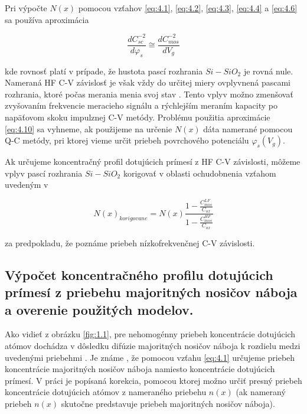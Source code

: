 \par Pri výpočte $N(x)$ pomocou vzťahov \ref{eq:4.1}, \ref{eq:4.2},
\ref{eq:4.3}, \ref{eq:4.4} a \ref{eq:4.6} sa používa aproximácia

\begin{equation}\label{eq:4.10}
\frac{dC_{sc}^{-2}}{d\varphi_{s}} \cong \frac{dC_{mos}^{-2}}{dV_{g}}
\end{equation}

kde rovnosť platí v prípade, že hustota pascí rozhrania $Si-SiO_{2}$
je rovná nule. Nameraná HF C-V závislosť je však vždy do určitej miery
ovplyvnená pascami rozhrania, ktoré počas merania menia svoj stav
\cite{4.15}. Tento vplyv možno zmenšovať zvyšovaním frekvencie
meracieho signálu a rýchlejším meraním kapacity po napäťovom skoku
impulznej C-V metódy.  Problému použitia aproximácie \ref{eq:4.10} sa
vyhneme, ak použijeme na určenie $N(x)$ dáta namerané pomocou Q-C
metódy, pri ktorej vieme určit priebeh povrchového potenciálu
$\varphi_{s}(V_{g})$.

\par Ak určujeme koncentračný profil dotujúcich prímesí z HF C-V
závislosti, môžeme vplyv pascí rozhrania $Si-SiO_{2}$ korigovať v
oblasti ochudobnenia vzťahom uvedeným v \cite{I.1}

\begin{equation}\label{eq:4.11}
N(x)_{korigovane} = N(x) \frac{1-\frac{C_{mos}^{LF}}{C_{ox}}}{1-\frac{C_{mos}^{HF}}{C_{ox}}}
\end{equation}

za predpokladu, že poznáme priebeh nízkofrekvenčnej C-V závislosti.


\subsection[Výpočet koncentračného profilu dotujúcich prímesí z priebehu majoritných nosičov náboja a overenie použitých modelov.]{Výpočet koncentračného profilu dotujúcich prímesí z priebehu majoritných nosičov náboja a overenie použitých modelov.}\label{sec:4.1.4}

Ako vidieť z obrázku \ref{fig:1.1}, pre nehomogénny priebeh
koncentrácie dotujúcich atómov dochádza v dôsledku difúzie majoritných
nosičov náboja k rozdielu medzi uvedenými priebehmi \cite{4.16}. Je
známe \cite{4.17}, že pomocou vzťahu \ref{eq:4.1} určujeme priebeh
koncentrácie majoritných nosičov náboja namiesto koncentrácie
dotujúcich prímesí. V práci \cite{4.18} je popísaná korekcia, pomocou
ktorej možno určiť presný priebeh koncentrácie dotujúcich atómov z
nameraného priebehu $n(x)$ (ak nameraný priebeh $n(x)$ skutočne
predstavuje priebeh majoritných nosičov náboja).

